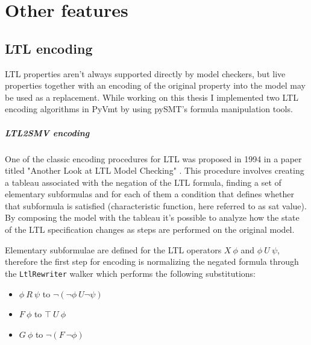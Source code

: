 \chapter{Other features}

\section{LTL encoding}
LTL properties aren't always supported directly by model checkers, but live properties together with an encoding of the original property into the model may be used as a replacement.
While working on this thesis I implemented two LTL encoding algorithms in PyVmt by using pySMT's formula manipulation tools.

\paragraph*{LTL2SMV encoding}
One of the classic encoding procedures for LTL was proposed in 1994 in a paper titled "Another Look at LTL Model Checking" \cite{Clarke1997}.
This procedure involves creating a tableau associated with the negation of the LTL formula, finding a set of elementary subformulas and for each of them a condition that defines whether that subformula is satisfied (characteristic function, here referred to as sat value).
By composing the model with the tableau it's possible to analyze how the state of the LTL specification changes as steps are performed on the original model.

Elementary subformulae are defined for the LTL operators \begin{math}X\ \phi\end{math} and \begin{math}\phi\ U\ \psi\end{math}, therefore the first step for encoding is normalizing the negated formula through the \texttt{LtlRewriter} walker which performs the following substitutions:
\begin{itemize}
    \item \begin{math}\phi\ R\ \psi\end{math} to \begin{math}\lnot(\lnot \phi\ U \lnot \psi)\end{math}
    \item \begin{math}F\ \phi\end{math} to \begin{math}\top\ U\ \phi\end{math}
    \item \begin{math}G\ \phi\end{math} to \begin{math}\lnot (F\ \lnot \phi)\end{math}
\end{itemize}

